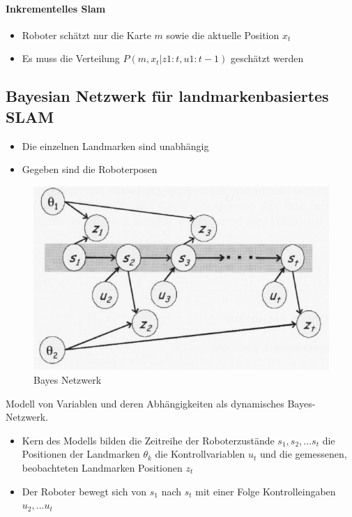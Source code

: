 \paragraph{Inkrementelles Slam}
\begin{itemize}
	\item Roboter schätzt nur die Karte $m$ sowie die aktuelle Position $x_t$
	\item Es muss die Verteilung $P(m, x_t | z1:t, u1:t-1)$ geschätzt werden
\end{itemize}
\subsection{Bayesian Netzwerk für landmarkenbasiertes SLAM}
\begin{itemize}
	\item Die einzelnen Landmarken sind unabhängig
	\item Gegeben sind die Roboterposen
\end{itemize}
\begin{figure}[H]
	\begin{center}
		\includegraphics[scale=0.8]{Resources/PNG/BayesNetzwerk}
		\caption{Bayes Netzwerk}
		\label{fig:PNG/BayesNetzwerk}
	\end{center}
\end{figure}
Modell von Variablen und deren Abhängigkeiten als dynamisches Bayes-Netzwerk.
\begin{itemize}
	\item Kern des Modells bilden die
	\subitem Zeitreihe der Roboterzustände $s_1, s_2, ... s_t$
	\subitem die Positionen der Landmarken $\theta_k$
	\subitem die Kontrollvariablen $u_t$
	\subitem und die gemessenen, beobachteten Landmarken Positionen $z_t$
	\item Der Roboter bewegt sich von $s_1$ nach $s_t$ mit einer Folge Kontrolleingaben $u_2, ... u_t$
\end{itemize}





















